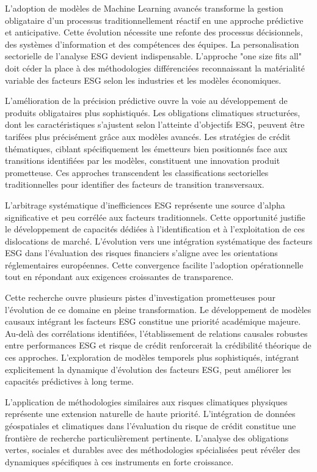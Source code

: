 L'adoption de modèles de Machine Learning avancés transforme la gestion obligataire d'un processus traditionnellement réactif en une approche prédictive et anticipative. Cette évolution nécessite une refonte des processus décisionnels, des systèmes d'information et des compétences des équipes. La personalisation sectorielle de l'analyse ESG devient indispensable. L'approche "one size fits all" doit céder la place à des méthodologies différenciées reconnaissant la matérialité variable des facteurs ESG selon les industries et les modèles économiques.

L'amélioration de la précision prédictive ouvre la voie au développement de produits obligataires plus sophistiqués. Les obligations climatiques structurées, dont les caractéristiques s'ajustent selon l'atteinte d'objectifs ESG, peuvent être tarifées plus précisément grâce aux modèles avancés. Les stratégies de crédit thématiques, ciblant spécifiquement les émetteurs bien positionnés face aux transitions identifiées par les modèles, constituent une innovation produit prometteuse. Ces approches transcendent les classifications sectorielles traditionnelles pour identifier des facteurs de transition transversaux.

L'arbitrage systématique d'inefficiences ESG représente une source d'alpha significative et peu corrélée aux facteurs traditionnels. Cette opportunité justifie le développement de capacités dédiées à l'identification et à l'exploitation de ces dislocations de marché. L'évolution vers une intégration systématique des facteurs ESG dans l'évaluation des risques financiers s'aligne avec les orientations réglementaires européennes. Cette convergence facilite l'adoption opérationnelle tout en répondant aux exigences croissantes de transparence.

Cette recherche ouvre plusieurs pistes d'investigation prometteuses pour l'évolution de ce domaine en pleine transformation. Le développement de modèles causaux intégrant les facteurs ESG constitue une priorité académique majeure. Au-delà des corrélations identifiées, l'établissement de relations causales robustes entre performances ESG et risque de crédit renforcerait la crédibilité théorique de ces approches. L'exploration de modèles temporels plus sophistiqués, intégrant explicitement la dynamique d'évolution des facteurs ESG, peut améliorer les capacités prédictives à long terme.

L'application de méthodologies similaires aux risques climatiques physiques représente une extension naturelle de haute priorité. L'intégration de données géospatiales et climatiques dans l'évaluation du risque de crédit constitue une frontière de recherche particulièrement pertinente. L'analyse des obligations vertes, sociales et durables avec des méthodologies spécialisées peut révéler des dynamiques spécifiques à ces instruments en forte croissance.

